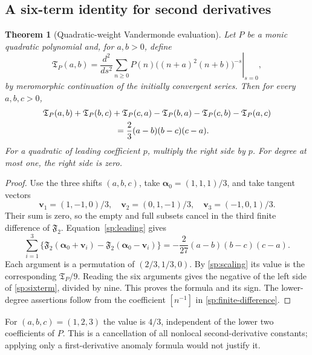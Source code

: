 \documentclass[11pt,letterpaper]{article}
\numberwithin{equation}{section}
\theoremstyle{plain}
\newtheorem{theorem}{Theorem}[section]
\theoremstyle{definition}
\theoremstyle{remark}
\begin{document}
\subsection{A six-term identity for second derivatives}

\begin{theorem}[Quadratic-weight Vandermonde evaluation]
\label{sp:thm:sixterm}
Let $P$ be a monic quadratic polynomial and, for $a,b>0$, define
\begin{equation}\label{sp:Tdef}
 \mathfrak T_P(a,b)=\left.\frac{d^2}{ds^2}
     \sum_{n\ge0}P(n)\bigl((n+a)^2(n+b)\bigr)^{-s}
                                      \right|_{s=0},
\end{equation}
by meromorphic continuation of the initially convergent series. Then
for every $a,b,c>0$,
\begin{align}\label{sp:sixterm}
 &\mathfrak T_P(a,b)+\mathfrak T_P(b,c)+\mathfrak T_P(c,a)
 -\mathfrak T_P(b,a)-\mathfrak T_P(c,b)-\mathfrak T_P(a,c)\notag\\
 &\hspace{30mm}=\frac23(a-b)(b-c)(c-a).
\end{align}
For a quadratic of leading coefficient $p$, multiply the right side
by $p$. For degree at most one, the right side is zero.
\end{theorem}

\begin{proof}
Use the three shifts $(a,b,c)$, take
$\boldsymbol\alpha_0=(1,1,1)/3$, and take tangent vectors
\[
 \boldsymbol v_1=(1,-1,0)/3,\quad
 \boldsymbol v_2=(0,1,-1)/3,\quad
 \boldsymbol v_3=(-1,0,1)/3.
\]
Their sum is zero, so the empty and full subsets cancel in the
third finite difference of $\mathfrak F_2$. Equation~\eqref{sp:leading}
gives
\[
 \sum_{i=1}^3\{\mathfrak F_2(\boldsymbol\alpha_0+\boldsymbol v_i)
      -\mathfrak F_2(\boldsymbol\alpha_0-\boldsymbol v_i)\}
 =-\frac2{27}(a-b)(b-c)(c-a).
\]
Each argument is a permutation of $(2/3,1/3,0)$. By
\eqref{sp:scaling} its value is the corresponding $\mathfrak T_P/9$.
Reading the six arguments gives the negative of the left side of
\eqref{sp:sixterm}, divided by nine. This proves the formula and its
sign. The lower-degree assertions follow from the coefficient
$[n^{-1}]$ in \eqref{sp:finite-difference}.
\end{proof}

For $(a,b,c)=(1,2,3)$ the value is $4/3$, independent of the lower
two coefficients of $P$. This is a cancellation of all nonlocal
second-derivative constants; applying only a first-derivative anomaly
formula would not justify it.
\end{document}
